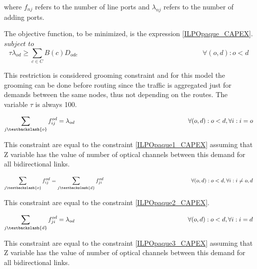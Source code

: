 \vspace{11pt}
where $f_{nj}$ refers to the number of line ports and $\lambda_{nj}$ refers to the number of adding ports.


\vspace{17pt}
The objective function, to be minimized, is the expression \ref{ILPOpaque_CAPEX}.\\

$subject$ $to$
\begin{equation}
\tau \lambda_{od} \geq \sum_{c\in C} B\left(c\right) D_{odc} \qquad \qquad \qquad \qquad \qquad \qquad \qquad \qquad \qquad
\forall(o,d) : o < d
\label{ILPTransp0_surv}
\end{equation}

This restriction is considered grooming constraint and for this model the grooming can be done before routing since the traffic is aggregated just for demands between the same nodes, thus not depending on the routes. The variable  $\tau$ is always 100.

\begin{equation}
\sum_{j\textbackslash \{o\}} f_{ij}^{od} = \lambda_{od}  \qquad \qquad \qquad \qquad \qquad \qquad \qquad \qquad \qquad
\forall(o,d) : o < d, \forall i: i = o
\label{ILPTransp1_surv}
\end{equation}

This constraint are equal to the constraint \ref{ILPOpaque1_CAPEX} assuming that Z variable has the value of number of optical channels between this demand for all bidirectional links.

\begin{equation}
\sum_{j\textbackslash \{o\}} f_{ij}^{od} = \sum_{j\textbackslash \{d\}} f_{ji}^{od} \qquad \qquad \qquad \qquad \qquad \qquad \qquad \qquad
\forall(o,d) : o < d, \forall i: i \neq o,d
\label{ILPTransp2_surv}
\end{equation}

This constraint are equal to the constraint \ref{ILPOpaque2_CAPEX}.

\begin{equation}
\sum_{j\textbackslash \{d\}} f_{ji}^{od} = \lambda_{od}  \qquad \qquad \qquad \qquad \qquad \qquad \qquad \qquad \qquad
\forall(o,d) : o < d, \forall i: i = d
\label{ILPTransp3_surv}
\end{equation}

This constraint are equal to the constraint \ref{ILPOpaque3_CAPEX} assuming that Z variable has the value of number of optical channels between this demand for all bidirectional links.

